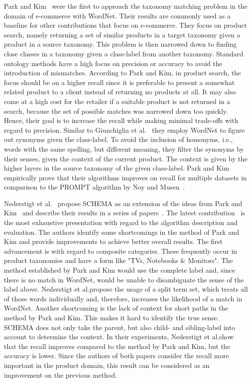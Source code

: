 Park and Kim~\cite{park2007ontology} were the first to approach the taxonomy matching problem in the  domain of
e-commerce with WordNet.
Their results are commonly used as a baseline for other contributions that focus on e-commerce.
They focus on product search, namely returning a set of similar products in a target taxonomy given a product in
a source taxonomy.
This problem is then narrowed down to finding close classes in a taxonomy given a class-label from another taxonomy.
Standard ontology methods have a high focus on precision or accuracy to avoid the introduction of mismatches.
According to Park and Kim, in product search, the focus should be on a higher recall since it is preferable to present
a somewhat related product to a client instead of returning no products at all.
It may also come at a high cost for the retailer if a suitable product is not returned in a search, because the set of
possible matches was narrowed down too quickly.
Hence, their goal is to increase the recall while making minimal trade-offs with regard to precision.
Similar to Giunchiglia et al.\@~\cite{giunchiglia2005semantic} they employ WordNet to figure out synonyms given
the class-label.
To avoid the inclusion of homonyms, i.e., words with the same spelling, but different meaning,
they filter the synonyms by their senses, given the context of the current product.
The context is given by the higher layers in the source taxonomy  of the given class-label.
Park and Kim empirically prove that their algorithms improves on recall for multiple datasets in comparison
to the PROMPT algorithm by Noy and Musen~\cite{noy2003prompt}.

Nederstigt et al.\@~\cite{nederstigt2016lexical} propose SCHEMA as an extension of the ideas from Park and Kim~\cite{park2007ontology}
and describe their results in a series of papers~\cite{nederstigt2016lexical, aanen2012schema, aanen2015automated}.
The latest contribution~\cite{nederstigt2016lexical} is the most exhaustive presentation with regard to the algorithm description
and evaluation.
The authors identify some shortcomings in the method of Park and Kim and provide improvements
to achieve better overall results.
The first advancement is with regard to composite categories.
These frequently occur in product taxonomies and have a form like "TVs, Notebooks \& Monitors".
The method established by Park and Kim would use the complete label and, since there is no match in WordNet, would be unable
to disambiguate the sense of the label above.
Nederstigt et al.\@ propose the usage of a split term set, which treats all of those words individually and, therefore,
increases the likelihood of a match in WordNet.
Another shortcoming is the lack of context for short paths in the method by Park and Kim.
This makes it hard to identify the true sense.
SCHEMA does not only take the parent, but also child- and sibling-label into account to determine the context.
In their experiments, Nederstigt et al.\@ show that the recall improves compared to the method by Park and Kim, but
the accuracy is lower.
Since the authors of both papers consider the recall more important in the product domain, this result can be considered as
an improvement on the previous method.

